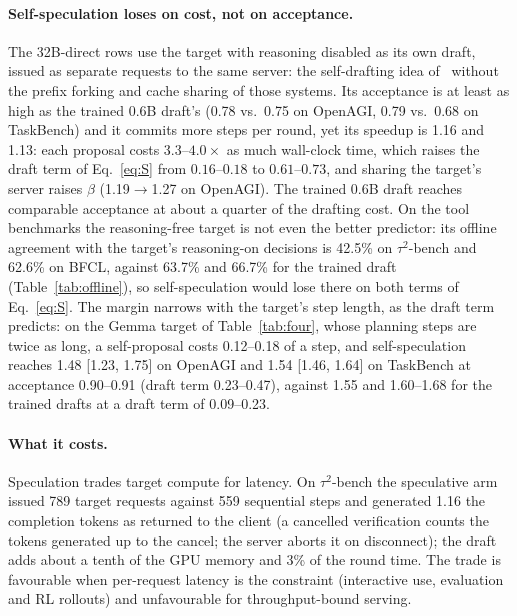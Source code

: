 \paragraph{Self-speculation loses on cost, not on acceptance.}
\label{app:selfspec}
The 32B-direct rows use the target with reasoning disabled as its own draft,
issued as separate requests to the same server: the self-drafting idea
of~\citet{spork,swyr} without the prefix forking and cache sharing of those systems.
Its acceptance is at least as high as the trained 0.6B draft's (0.78 vs.\
0.75 on OpenAGI, 0.79 vs.\ 0.68 on TaskBench) and it commits more steps per
round, yet its speedup is 1.16\xx{} and 1.13\xx{}: each proposal costs
$3.3$--$4.0\times$ as much wall-clock time, which raises the draft term of
Eq.~\ref{eq:S} from $0.16$--$0.18$ to $0.61$--$0.73$, and sharing the target's
server raises $\beta$ (1.19$\to$1.27 on OpenAGI). The trained 0.6B draft
reaches comparable acceptance at about a quarter of the drafting cost. On the
tool benchmarks the reasoning-free target is not even the better predictor: its
offline agreement with the target's reasoning-on decisions is 42.5\% on $\tau^2$-bench
and 62.6\% on BFCL, against 63.7\% and 66.7\% for the trained draft
(Table~\ref{tab:offline}), so self-speculation would lose there on both terms
of Eq.~\ref{eq:S}. The margin narrows with the target's step length, as the draft term predicts: on the
Gemma target of Table~\ref{tab:four}, whose planning steps are twice as long, a self-proposal costs
0.12--0.18 of a step, and self-speculation reaches 1.48\xx{} [1.23, 1.75] on OpenAGI and 1.54\xx{}
[1.46, 1.64] on TaskBench at acceptance 0.90--0.91 (draft term 0.23--0.47), against 1.55\xx{} and
1.60--1.68\xx{} for the trained drafts at a draft term of 0.09--0.23.

\paragraph{What it costs.}
Speculation trades target compute for latency. On $\tau^2$-bench the speculative arm issued 789 target requests
against 559 sequential steps and generated 1.16\xx{} the completion tokens as returned to the client
(a cancelled verification counts the tokens generated up to the cancel; the server aborts it on
disconnect); the draft adds about a tenth of the GPU memory and 3\% of the round time. The trade is
favourable when per-request latency is the constraint (interactive use, evaluation and RL rollouts) and
unfavourable for throughput-bound serving.

